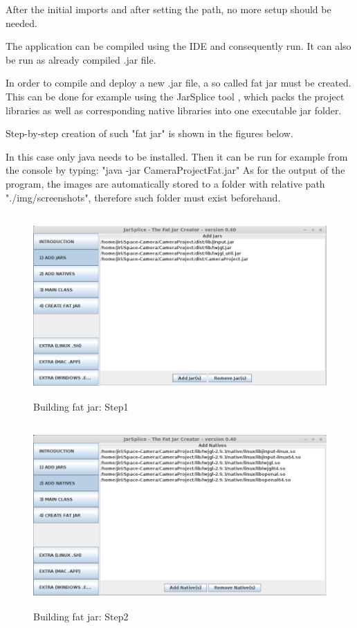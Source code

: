 \documentclass[english,12pt,a4paper,pdftex,elec,utf8]{aaltothesis}
\begin{document}
After the initial imports and after setting the path, no more setup should be needed. 

The application can be compiled using the IDE and consequently run.
It can also be run as already compiled .jar file. 

In order to compile and deploy a new .jar file, a so called fat jar must be created. This can be done for example using the  JarSplice tool \cite{JarSplice}, which packs the project libraries as well as corresponding native libraries into one executable jar folder.

Step-by-step creation of such "fat jar" is shown in the figures below.

In this case only java needs to be installed. Then it can be run for example from the console by typing: "java -jar CameraProjectFat.jar" As for the output of the program, the images are automatically stored to a folder with relative path "./img/screenshots", therefore such folder must exist beforehand.

\begin{figure}[htb]
\centering \includegraphics[height=7cm]{jarSplice1.png}
\caption{Building fat jar: Step1\label{jarSplice1}}
\end{figure}

\begin{figure}[htb]
\centering \includegraphics[height=7cm]{jarSplice2.png}
\caption{Building fat jar: Step2\label{jarSplice2}}
\end{figure}
\end{document}
